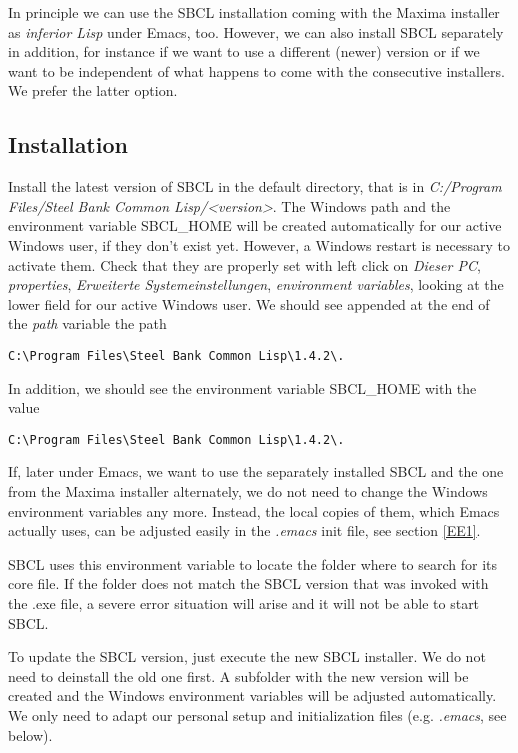 \documentclass[../Maxima_Workbook.tex]{subfiles}
\begin{document}
\lz In principle we can use the SBCL installation coming with the Maxima installer as \emph{inferior Lisp} under Emacs, too. However, we can also install SBCL separately in addition, for instance if we want to use a different (newer) version or if we want to be independent of what happens to come with the consecutive installers. We prefer the latter option.

\subsection{Installation}

Install the latest version of SBCL in the default directory, that is in \emph{C:/Program Files/Steel Bank Common Lisp/<version>}. The Windows path and the environment variable SBCL\_HOME will be created automatically for our active Windows user, if they don't exist yet. However, a Windows restart is necessary to activate them. Check that they are properly set with left click on \emph{Dieser PC}, \emph{properties}, \emph{Erweiterte Systemeinstellungen}, \emph{environment variables}, looking at the lower field for our active Windows user. We should see appended at the end of the \emph{path} variable the path
\begin{lstlisting}[style=blue]
C:\Program Files\Steel Bank Common Lisp\1.4.2\.
\end{lstlisting}
In addition, we should see the environment variable SBCL\_HOME with the value
\begin{lstlisting}[style=blue]
C:\Program Files\Steel Bank Common Lisp\1.4.2\.
\end{lstlisting}
If, later under Emacs, we want to use the separately installed SBCL and the one from the Maxima installer alternately, we do not need to change the Windows environment variables any more. Instead, the local copies of them, which Emacs actually uses, can be adjusted easily in the \emph{.emacs} init file, see section \ref{EE1}.

\lz SBCL uses this environment variable to locate the folder where to search for its core file. If the folder does not match the SBCL version that was invoked with the .exe file, a severe error situation will arise and it will not be able to start SBCL.

\lz To update the SBCL version, just execute the new SBCL installer. We do not need to deinstall the old one first. A subfolder with the new version will be created and the Windows environment variables will be adjusted automatically. We only need to adapt our personal setup and initialization files (e.g. \emph{.emacs}, see below).
\end{document}
